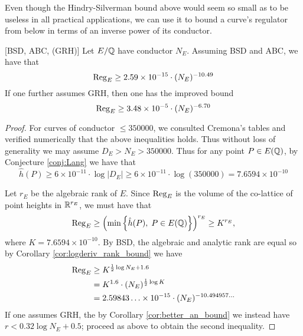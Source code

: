 Even though the Hindry-Silverman bound above would seem so small as to be useless in all practical applications, we can use it to bound a curve's regulator from below in terms of an inverse power of its conductor.
\begin{theorem}\label{thm:regulator_lower_bound}[BSD, ABC, (GRH)]
Let $E/\mathbb{Q}$ have conductor $N_E$. Assuming BSD and ABC, we have that
\begin{equation}
\operatorname{Reg}_E \ge 2.59 \times 10^{-15} \cdot (N_E)^{-10.49}
\end{equation}
If one further assumes GRH, then one has the improved bound
\begin{equation}
\operatorname{Reg}_E \ge 3.48 \times 10^{-5} \cdot (N_E)^{-6.70}
\end{equation}
\end{theorem}
\begin{proof}
For curves of conductor $\le 350000$, we consulted Cremona's tables and verified numerically that the above inequalities holds. Thus without loss of generality we may assume $D_E > N_E > 350000$. Thus for any point $P \in E(\mathbb{Q})$, by Conjecture \ref{conj:Lang} we have that
\begin{equation}
\hat{h}(P) \ge 6\times10^{-11} \cdot \log |D_E| \ge 6\times10^{-11} \cdot \log(350000) = 7.6594 \times 10^{-10}
\end{equation}

Let $r_E$ be the algebraic rank of $E$. Since $\operatorname{Reg}_E$ is the volume of the co-lattice of point heights in $\mathbb{R}^{r_E}$, we must have that
\begin{equation*}
\operatorname{Reg}_E \ge \left(\min \left\{ \hat{h}(P), \; P \in E(\mathbb{Q})\right\}\right)^{r_E} \ge  K^{r_E},
\end{equation*}
where $K = 7.6594 \times 10^{-10}$. By BSD, the algebraic and analytic rank are equal so by Corollary \ref{cor:logderiv_rank_bound} we have
\begin{align*}
\operatorname{Reg}_E &\ge K^{\frac{1}{2} \log N_E + 1.6} \\
&= K^{1.6} \cdot (N_E)^{\frac{1}{2} \log K} \\
&= 2.59843\ldots \times 10^{-15} \cdot (N_E)^{-10.494957\ldots}
\end{align*}
If one assumes GRH, the by Corollary \ref{cor:better_an_bound} we instead have $r < 0.32 \log N_E + 0.5$; proceed as above to obtain the second inequality.
\end{proof}

